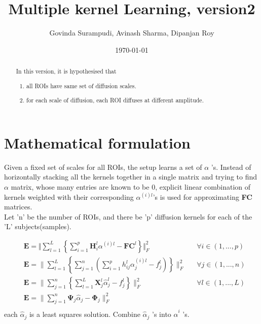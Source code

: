 \documentclass[a4paper]{article}
\title{Multiple kernel Learning, version2}
\author{Govinda Surampudi, Avinash Sharma, Dipanjan Roy}
\date{\today}
\begin{document}
\maketitle

\begin{abstract}
In this version, it is hypothesised that 
\begin{enumerate}
\item all ROIs have same set of diffusion scales.
\item for each scale of diffusion, each ROI diffuses at different amplitude.
\end{enumerate}
\end{abstract}

\section{Mathematical formulation}
Given a fixed set of scales for all ROIs, the setup learns a set of $\alpha$ 's. Instead of horizontally stacking all the kernels together in a single matrix and trying to find $\alpha$ matrix, whose many entries are known to be 0, explicit linear combination of kernels weighted with their corresponding $\alpha^{ \left( i \right) l }$'s is used for approximating \textbf{FC} matrices. \\
Let 'n' be the number of ROIs, and there be 'p' diffusion kernels for each of the 'L' subjects(samples).

\begin{equation*}
\begin{aligned}
& \textbf{E} = \Vert \sum_{l = 1}^{L} \left\lbrace 
\sum_{i = 1}^{p} \textbf{H}_{i}^{l} \alpha^{\left( i \right)l} - \textbf{FC}^{l}
\right\rbrace \Vert_{F}^{2} && \forall i \in \left( 1,...,p \right) \\
& \textbf{E} = \| \sum_{l = 1}^{L} \left\lbrace 
\sum_{j = 1}^{n} \left( 
\sum_{i = 1}^{p} h_{ij}^{l} \alpha_{j}^{\left( i \right)l} - f_{j}^{l}
\right) \right\rbrace \|_{F}^{2} && \forall j \in \left( 1,...,n \right) \\
& \textbf{E} = \| \sum_{j = 1}^{n} \left\lbrace 
\sum_{l = 1}^{L} \textbf{X}_{j}^{l} \hat{\alpha}_{j}^{l} - f_{j}^{l}
\right\rbrace \|_{F}^{2} && \forall l \in \left( 1,...,L \right) \\
&  \textbf{E} = \| \sum_{j = 1}^{n} \mathbf{\Psi}_{j} \hat{\alpha}_{j} - \mathbf{\Phi}_{j}
\|_{F}^{2} \\
\end{aligned}
\end{equation*}
each $\hat{\alpha}_{j}$ is a least squares solution. Combine $\hat{\alpha}_{j}$ 's into  $\hat{\alpha}^{i}$ 's.
\end{document}
